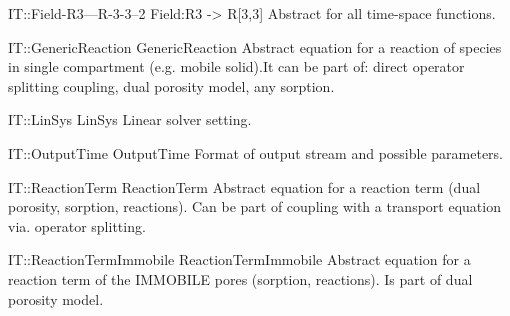 \begin{AbstractType}
	{IT::Field-R3---R-3-3--2}
	{Field:R3 -{\textgreater} R[3,3]}
	{}
	{{{Abstract for all time-space functions.}}}
\end{AbstractType}
\begin{AbstractType}
	{IT::GenericReaction}
	{GenericReaction}
	{}
	{{{Abstract equation for a reaction of species in single compartment (e.g. mobile solid).It can be part of: direct operator splitting coupling, dual porosity model, any sorption.}}}
\end{AbstractType}
\begin{AbstractType}
	{IT::LinSys}
	{LinSys}
	{}
	{{{Linear solver setting.}}}
\end{AbstractType}
\begin{AbstractType}
	{IT::OutputTime}
	{OutputTime}
	{}
	{{{Format of output stream and possible parameters.}}}
\end{AbstractType}
\begin{AbstractType}
	{IT::ReactionTerm}
	{ReactionTerm}
	{}
	{{{Abstract equation for a reaction term (dual porosity, sorption, reactions). Can be part of coupling with a transport equation via. operator splitting.}}}
\end{AbstractType}
\begin{AbstractType}
	{IT::ReactionTermImmobile}
	{ReactionTermImmobile}
	{}
	{{{Abstract equation for a reaction term of the IMMOBILE pores (sorption, reactions). Is part of dual porosity model.}}}
\end{AbstractType}
